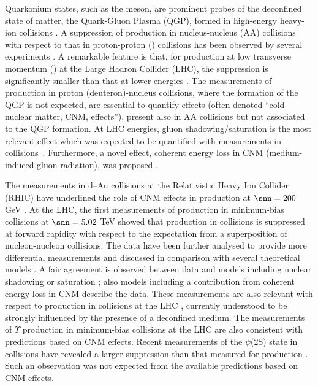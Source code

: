  
Quarkonium states, such as the \jpsi meson, are prominent probes of the deconfined state of matter, the Quark-Gluon Plasma (QGP), formed in high-energy heavy-ion collisions \cite{Matsui:1986aa}. A suppression of \jpsi production in nucleus-nucleus (AA) collisions with respect to that in proton-proton (\pp) collisions has been observed by several experiments \cite{Alessandro:2005aa,Arnaldi:2007aa,Adare:2011aa,Abelev:2012ab,Adamczyk:2013tvk,Abelev:2014ad,Chatrchyan:2012aa,Aad:2011aa,Adam:2016rdg}. A remarkable feature is that, for \jpsi production at low transverse momentum (\pt) at the Large Hadron Collider (LHC), the suppression is significantly smaller than that at lower energies \cite{Abelev:2012ab,Abelev:2014ad,Adam:2016rdg}. The measurements of \jpsi production in proton (deuteron)-nucleus collisions, where the formation of the QGP is not expected, are essential to quantify effects (often denoted ``cold nuclear matter, CNM, effects''), present also in AA collisions but not associated to the QGP formation. At LHC energies, gluon shadowing/saturation is the most relevant effect which was expected to be quantified with measurements in \ppb collisions~\cite{Salgado:2012aa,Vogt:2013aa}. Furthermore, a novel effect, coherent energy loss in CNM (medium-induced gluon radiation), was proposed \cite{Arleo:2013aa}.

The measurements in d--Au collisions at the Relativistic Heavy Ion Collider (RHIC) have underlined the role of CNM effects in \jpsi production at $\snn=200$ GeV \cite{Adare:2008aa,Adare:2011ab,Adare:2013aa}. At the LHC, the first measurements of \jpsi production in minimum-bias \ppb collisions at $\snn=5.02$ TeV \cite{Aaij:2013zxa,Abelev:2014aa} showed that \jpsi production in \ppb collisions is suppressed at forward rapidity with respect to the expectation from a superposition of nucleon-nucleon collisions. The data have been further analysed to provide more differential measurements and discussed in comparison with several theoretical models \cite{Adam:2015ac}. A fair agreement is observed between data and models including nuclear shadowing \cite{Vogt:2013aa} or saturation \cite{Ma:2015sia,Ducloue:2015gfa}; also models including a contribution from coherent energy loss in CNM \cite{Arleo:2013aa} describe the data. These measurements are also relevant with respect to \jpsi production in \pb collisions at the LHC \cite{Abelev:2012ab,Abelev:2014ad}, currently understood to be strongly influenced by the presence of a deconfined medium. The measurements of $\Upsilon$ production in minimum-bias \ppb collisions at the LHC \cite{Aaij:2014ab,Abelev:2015ab} are also consistent with predictions based on CNM effects. Recent measurements of the $\psi$(2S) state in \ppb collisions have revealed a larger suppression than that measured for \jpsi production \cite{Abelev:2014ac,Aaij:2016eyl}. Such an observation was not expected from the available predictions based on CNM effects.

